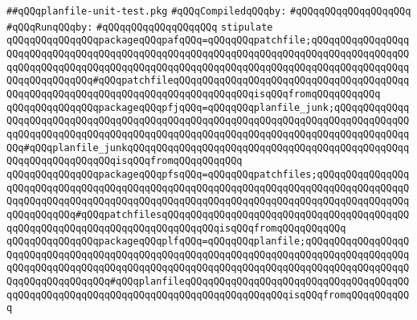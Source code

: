 \label{src/lib/make-library-glue/planfile-unit-test.pkg}
\verb|##qQQqplanfile-unit-test.pkg|\newline
\newline
\verb|#qQQqCompiledqQQqby:|\newline
\verb|#qQQqqQQqqQQqqQQqqQQq|\newline
\newline
\verb|#qQQqRunqQQqby:|\newline
\verb|#qQQqqQQqqQQqqQQqqQQq|\newline
\newline
\verb|stipulate|\newline
\verb|qQQqqQQqqQQqqQQqpackageqQQqpafqQQq=qQQqqQQqpatchfile;qQQqqQQqqQQqqQQqqQQqqQQqqQQqqQQqqQQqqQQqqQQqqQQqqQQqqQQqqQQqqQQqqQQqqQQqqQQqqQQqqQQqqQQqqQQqqQQqqQQqqQQqqQQqqQQqqQQqqQQqqQQqqQQqqQQqqQQqqQQqqQQqqQQqqQQqqQQqqQQqqQQqqQQqqQQq#qQQqpatchfileqQQqqQQqqQQqqQQqqQQqqQQqqQQqqQQqqQQqqQQqqQQqqQQqqQQqqQQqqQQqqQQqqQQqqQQqqQQqqQQqqQQqisqQQqfromqQQqqQQqqQQq|\newline
\verb|qQQqqQQqqQQqqQQqpackageqQQqpfjqQQq=qQQqqQQqplanfile_junk;qQQqqQQqqQQqqQQqqQQqqQQqqQQqqQQqqQQqqQQqqQQqqQQqqQQqqQQqqQQqqQQqqQQqqQQqqQQqqQQqqQQqqQQqqQQqqQQqqQQqqQQqqQQqqQQqqQQqqQQqqQQqqQQqqQQqqQQqqQQqqQQqqQQqqQQqqQQq#qQQqplanfile_junkqQQqqQQqqQQqqQQqqQQqqQQqqQQqqQQqqQQqqQQqqQQqqQQqqQQqqQQqqQQqqQQqqQQqisqQQqfromqQQqqQQqqQQq|\newline
\verb|qQQqqQQqqQQqqQQqpackageqQQqpfsqQQq=qQQqqQQqpatchfiles;qQQqqQQqqQQqqQQqqQQqqQQqqQQqqQQqqQQqqQQqqQQqqQQqqQQqqQQqqQQqqQQqqQQqqQQqqQQqqQQqqQQqqQQqqQQqqQQqqQQqqQQqqQQqqQQqqQQqqQQqqQQqqQQqqQQqqQQqqQQqqQQqqQQqqQQqqQQqqQQqqQQqqQQq#qQQqpatchfilesqQQqqQQqqQQqqQQqqQQqqQQqqQQqqQQqqQQqqQQqqQQqqQQqqQQqqQQqqQQqqQQqqQQqqQQqqQQqqQQqisqQQqfromqQQqqQQqqQQq|\newline
\verb|qQQqqQQqqQQqqQQqpackageqQQqplfqQQq=qQQqqQQqplanfile;qQQqqQQqqQQqqQQqqQQqqQQqqQQqqQQqqQQqqQQqqQQqqQQqqQQqqQQqqQQqqQQqqQQqqQQqqQQqqQQqqQQqqQQqqQQqqQQqqQQqqQQqqQQqqQQqqQQqqQQqqQQqqQQqqQQqqQQqqQQqqQQqqQQqqQQqqQQqqQQqqQQqqQQqqQQqqQQq#qQQqplanfileqQQqqQQqqQQqqQQqqQQqqQQqqQQqqQQqqQQqqQQqqQQqqQQqqQQqqQQqqQQqqQQqqQQqqQQqqQQqqQQqqQQqqQQqisqQQqfromqQQqqQQqqQQq|\newline
